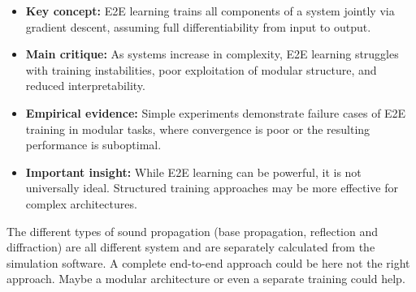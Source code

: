 			\begin{itemize}[itemsep=1mm, parsep=0pt]
				\item \textbf{Key concept:} E2E learning trains all components of a system jointly via gradient descent, assuming full differentiability from input to output.
				\item \textbf{Main critique:} As systems increase in complexity, E2E learning struggles with training instabilities, poor exploitation of modular structure, and reduced interpretability.
				\item \textbf{Empirical evidence:} Simple experiments demonstrate failure cases of E2E training in modular tasks, where convergence is poor or the resulting performance is suboptimal.
				\item \textbf{Important insight:} While E2E learning can be powerful, it is not universally ideal. Structured training approaches may be more effective for complex architectures.
			\end{itemize}
			
			The different types of sound propagation (base propagation, reflection and diffraction) are all different system and are separately calculated from the simulation software. A complete end-to-end approach could be here not the right approach. Maybe a modular architecture or even a separate training could help.
			
